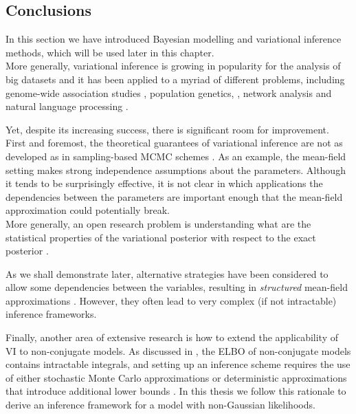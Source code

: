 \subsection{Conclusions}

In this section we have introduced Bayesian modelling and variational inference methods, which will be used later in this chapter.\\
More generally, variational inference is growing in popularity for the analysis of big datasets and it has been applied to a myriad of different problems, including genome-wide association studies \cite{Carbonetto2012}, population genetics, \cite{Raj2014}, network analysis \cite{Sanguinetti2006} and natural language processing \cite{Blei2003}.

Yet, despite its increasing success, there is significant room for improvement. First and foremost, the theoretical guarantees of variational inference are not as developed as in sampling-based MCMC schemes \cite{Blei2016,Zhang2017,Nakajima2007}. As an example, the mean-field setting makes strong independence assumptions about the parameters.  Although it tends to be surprisingly effective, it is not clear in which applications the dependencies between the parameters are important enough that the mean-field approximation could potentially break.\\
More generally, an open research problem is understanding what are the statistical properties of the variational posterior with respect to the exact posterior \cite{Blei2016,Zhang2017}.

As we shall demonstrate later, alternative strategies have been considered to allow some dependencies between the variables, resulting in \textit{structured} mean-field approximations \cite{Hoffman2014,Titsias2011}. However, they often lead to very complex (if not intractable) inference frameworks. 

Finally, another area of extensive research is how to extend the applicability of VI to non-conjugate models. As discussed in , the ELBO of non-conjugate models contains intractable integrals, and setting up an inference scheme requires the use of either stochastic Monte Carlo approximations or deterministic approximations that introduce additional lower bounds \cite{Zhang2017,Seeger2012,Khan2017}. In this thesis we follow this rationale to derive an inference framework for a model with non-Gaussian likelihoods.
